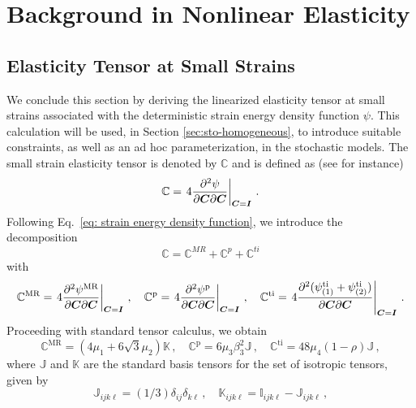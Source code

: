 \section{Background in Nonlinear Elasticity}
\label{sec:background-det-nonlin}


\subsection{Elasticity Tensor at Small Strains} \label{Linearization}
We conclude this section by deriving the linearized elasticity tensor at small strains associated with the deterministic strain energy density function $\psi$. This calculation will be used, in Section \ref{sec:sto-homogeneous}, to introduce suitable constraints, as well as an ad hoc parameterization, in the stochastic models. The small strain elasticity tensor is denoted by $\mathbb{C}$ and is defined as (see \cite{Holzapfel-Book-2000} for instance)
\begin{equation}
    \mathbb{C} = \left.4\frac{\partial^2 \psi}{\partial \boldsymbol{C} \partial \boldsymbol{C}}\right\vert_{\boldsymbol{C} = \boldsymbol{I}}\,. \label{eq:elasticity-def}
\end{equation}
Following Eq.~\ref{eq: strain energy density function}, we introduce the decomposition
\begin{equation}
    \mathbb{C} = \mathbb{C}^{MR} + \mathbb{C}^{p} + \mathbb{C}^{ti}
\end{equation}
with
\begin{equation}
    \mathbb{C}^{\text{MR}} = \left.4\frac{\partial^2 \psi^{\text{MR}}}{\partial \boldsymbol{C} \partial \boldsymbol{C}}\right\vert_{\boldsymbol{C} = \boldsymbol{I}}\,, \quad
    \mathbb{C}^{\text{p}} = \left.4\frac{\partial^2 \psi^{\text{p}}}{\partial \boldsymbol{C} \partial \boldsymbol{C}}\right\vert_{\boldsymbol{C} = \boldsymbol{I}}\,, \quad
    \mathbb{C}^{\text{ti}} = \left.4\frac{\partial^2(\psi_{(1)}^{\text{ti}} + \psi_{(2)}^{\text{ti}})}{\partial \boldsymbol{C} \partial \boldsymbol{C}}\right\vert_{\boldsymbol{C} = \boldsymbol{I}}\,.
\end{equation}
Proceeding with standard tensor calculus, we obtain
\begin{equation}
    \mathbb{C}^{\text{MR}} = (4 \mu_1 + 6 \sqrt{3} \mu_2) \mathbb{K}\,, \quad \mathbb{C}^{\text{p}} = 6 \mu_3 \beta_3^2 \mathbb{J}\,, \quad \mathbb{C}^{\text{ti}} = 48 \mu_4(1-\rho)\mathbb{J}\,,
\end{equation}
where $\mathbb{J}$ and $\mathbb{K}$ are the standard basis tensors for the set of isotropic tensors, given by
\begin{equation}
    \mathbb{J}_{ijk\ell} = (1/3) \delta_{ij} \delta_{k\ell}\,, \quad \mathbb{K}_{ijk\ell} = \mathbb{I}_{ijk\ell} - \mathbb{J}_{ijk\ell}\,,
\end{equation}
